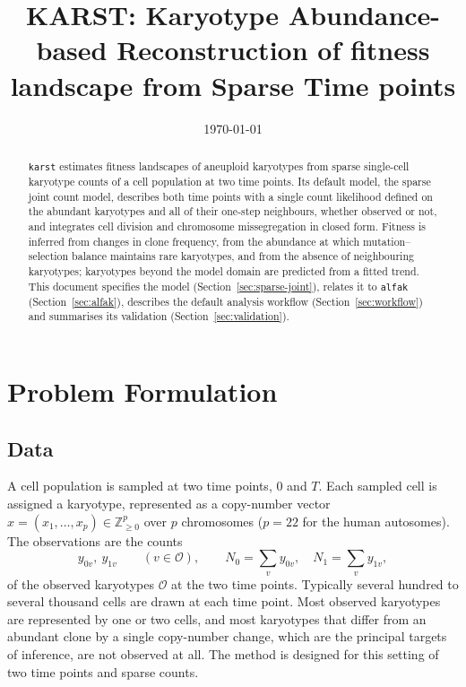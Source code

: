 \documentclass[11pt]{article}
\title{KARST: Karyotype Abundance-based Reconstruction of fitness landscape from Sparse Time points}
\author{}
\date{\today}
\begin{document}
\maketitle

\begin{abstract}
\texttt{karst} estimates fitness landscapes of aneuploid karyotypes from sparse
single-cell karyotype counts of a cell population at two time points. Its
default model, the sparse joint count model, describes both time points with
a single count likelihood
defined on the abundant karyotypes and all of their one-step neighbours,
whether observed or not, and integrates cell division and chromosome
missegregation in closed form. Fitness is inferred from changes in clone
frequency, from the abundance at which mutation--selection balance maintains
rare karyotypes, and from the absence of neighbouring karyotypes; karyotypes
beyond the model domain are predicted from a fitted trend. This document
specifies the model (Section~\ref{sec:sparse-joint}), relates it to
\texttt{alfak} (Section~\ref{sec:alfak}), describes the default analysis
workflow (Section~\ref{sec:workflow}) and summarises its validation
(Section~\ref{sec:validation}).
\end{abstract}

\section{Problem Formulation}
\label{sec:setting}

\subsection{Data}

A cell population is sampled at two time points, $0$ and $T$. Each sampled
cell is assigned a karyotype, represented as a copy-number vector
$x=(x_1,\ldots,x_p)\in\mathbb{Z}_{\ge 0}^p$ over $p$ chromosomes ($p=22$ for
the human autosomes). The observations are the counts
\[
  y_{0v},\ y_{1v}\qquad (v\in\mathcal{O}),
  \qquad N_0=\sum_v y_{0v},\quad N_1=\sum_v y_{1v},
\]
of the observed karyotypes $\mathcal{O}$ at the two time points. Typically
several hundred to several thousand cells are drawn at each time point. Most observed karyotypes
are represented by one or two cells, and most karyotypes that differ from an
abundant clone by a single copy-number change, which are the principal targets
of inference, are not observed at all. The method is designed for this
setting of two time points and sparse counts.
\end{document}
